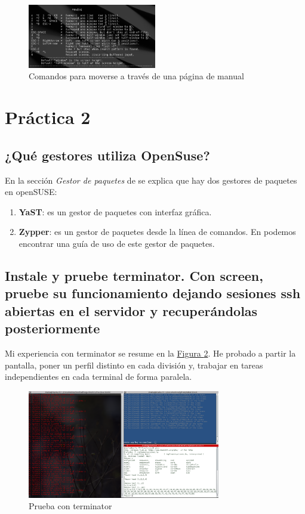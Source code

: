 \documentclass[10pt,a4paper,spanish]{article}
\numberwithin{equation}{section} %
\numberwithin{figure}{section} %
\numberwithin{table}{section} %
\begin{document}
\begin{figure}[!h]
\centering
\includegraphics[width=0.5\textwidth]{1_20}
\caption{Comandos para moverse a través de una página de manual}
\label{man}
\end{figure}

\section{Práctica 2}
\subsection{¿Qué gestores utiliza OpenSuse?}
En la sección \textit{Gestor de paquetes} de \cite{wikisuse} se explica que hay dos gestores de paquetes en openSUSE:
\begin{enumerate}[$\bullet$]
    \item \textbf{YaST}: es un gestor de paquetes con interfaz gráfica.
    \item \textbf{Zypper}: es un gestor de paquetes desde la línea de comandos. En \cite{zypper} podemos encontrar una guía de uso de este gestor de paquetes.
\end{enumerate}

\subsection{Instale y pruebe terminator. Con screen, pruebe su funcionamiento dejando sesiones ssh abiertas en el servidor y recuperándolas posteriormente}
Mi experiencia con terminator se resume en la \hyperref[terminator]{Figura \ref*{terminator}}. He probado a partir la pantalla, poner un perfil distinto en cada división y, trabajar en tareas independientes en cada terminal de forma paralela.

\begin{figure}[!h]
\centering
\includegraphics[width=0.75\textwidth]{2_16}
\caption{Prueba con terminator}
\label{terminator}
\end{figure}
\end{document}
